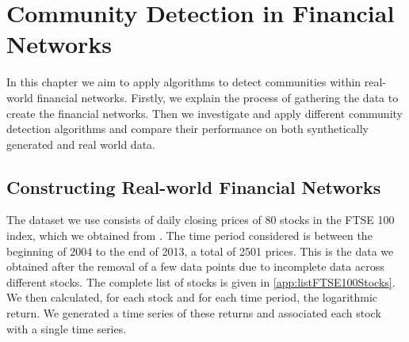 
\chapter{Community Detection in Financial Networks}

\label{cha:communityDetectionFinancialNetworks}


In this chapter we aim to apply algorithms to detect communities within real-world financial networks.
Firstly, we explain the process of gathering the data to create the financial networks.
Then we investigate and apply different community detection algorithms and compare their performance on both synthetically generated and real world data.


\section{Constructing Real-world Financial Networks}
\label{sec:constructingRealWorldFinancialNetworks}

The dataset we use consists of daily closing prices of 80 stocks in the FTSE 100 index, which we obtained from \cite{YahFi}. The time period considered is between the beginning of 2004 to the end of 2013, a total of 2501 prices. This is the data we obtained after the removal of a few data points due to incomplete data across different stocks. The complete list of stocks is given in \cref{app:listFTSE100Stocks}. We then calculated, for each stock and for each time period, the logarithmic return. We generated a time series of these returns and associated each stock with a single time series.